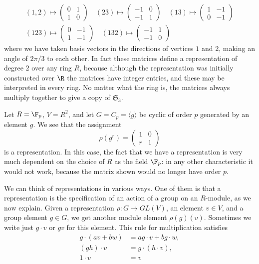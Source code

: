 \begin{example}
\[\begin{array}{c}
(1,2)\mapsto\begin{pmatrix}
0&1\\
1&0
\end{pmatrix}\quad (23)\mapsto\begin{pmatrix}
-1&0\\
-1&1
\end{pmatrix}\quad (13)\mapsto\begin{pmatrix}
1&-1\\
0&-1
\end{pmatrix}\\
(123)\mapsto\begin{pmatrix}
0&-1\\
1&-1
\end{pmatrix}\quad(132)\mapsto\begin{pmatrix}
-1&1\\
-1&0
\end{pmatrix}
\end{array}\]
where we have taken basis vectors in the directions of vertices $1$ and $2$, making an angle of $2\pi/3$ to each other. In fact these matrices define a representation of degree $2$ over any ring $R$, because although the representation was initially constructed over $\R$ the matrices have integer entries, and these may be interpreted in every ring. No matter what the ring is, the matrices always multiply together to give a copy of $\mathfrak{S}_3$.
\end{example}
\begin{example}\label{representation C_p on F_p eg}
Let $R=\F_p$, $V=R^2$, and let $G=C_p=\langle g\rangle$ be cyclic of order $p$ generated by an element $g$. We see that the assignment
\[\rho(g^r)=\begin{pmatrix}
1&0\\
r&1
\end{pmatrix}\]
is a representation. In this case, the fact that we have a representation is very much dependent on the choice of $R$ as the field $\F_p$: in any other characteristic it would not work, because the matrix shown would no longer have order $p$.
\end{example}
We can think of representations in various ways. One of them is that a representation is the specification of an action of a group on an $R$-module, as we now explain. Given a representation $\rho:G\to GL(V)$, an element $v\in V$, and a group element $g\in G$, we get another module element $\rho(g)(v)$. Sometimes we write just $g\cdot v$ or $gv$ for this element. This rule for multiplication satisfies
\begin{align*}
g\cdot(av+bw)&=ag\cdot v+bg\cdot w,\\
(gh)\cdot v&=g\cdot(h\cdot v),\\
1\cdot v&=v
\end{align*}
